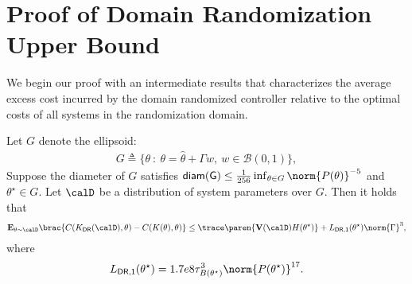 \section{Proof of Domain Randomization Upper Bound}
\label{s: domain randomization proofs}


We begin our proof with an intermediate results that characterizes the average excess cost incurred by the domain randomized controller relative to the optimal costs of all systems in the randomization domain.  
 
\begin{lemma}
    \label{lem: DR objective upper bound}
    Let $G$ denote the ellipsoid:
    \begin{align*}
        G \triangleq \{\theta ~:~ \theta=\hat \theta + \Gamma w, ~ w\in\mathcal{B}(0, 1)\},
    \end{align*} 
    Suppose the diameter of $G$ satisfies $\mathsf{diam(G)}\leq\frac{1}{256}\inf_{\theta\in G}\norm{P(\theta)}^{-5}$ and $\theta^\star\in G$. 
    Let $\calD$ be a distribution of system parameters over $G$. Then it holds that
    \begin{align*}
        \mathbf{E}_{\theta \sim \calD} 
        \brac{C(K_{\mathsf{DR}}(\calD), \theta) - C(K(\theta), \theta)} \leq \trace\paren{\mathbf{V}(\calD) H(\theta^\star)} + L_{\mathsf{DR,1}}(\theta^\star)  \norm{\Gamma}^3,
    \end{align*}
    where 
    \begin{align*}
        L_{\mathsf{DR,1}}(\theta^\star) = 1.7e8\tau_{B(\theta^\star)}^3\norm{P(\theta^\star)}^{17}.
    \end{align*} 
\end{lemma}
